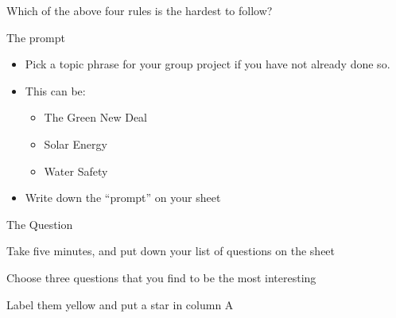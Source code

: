 \begin{frame}{Which of the above four rules is the hardest to follow?}
\protect\hypertarget{which-of-the-above-four-rules-is-the-hardest-to-follow}{}

\end{frame}

\begin{frame}{The prompt}
\protect\hypertarget{the-prompt}{}

\begin{itemize}
\tightlist
\item
  Pick a topic phrase for your group project if you have not already
  done so.
\item
  This can be:

  \begin{itemize}
  \tightlist
  \item
    The Green New Deal
  \item
    Solar Energy
  \item
    Water Safety
  \end{itemize}
\item
  Write down the ``prompt'' on your sheet
\end{itemize}

\end{frame}

\begin{frame}{The Question}
\protect\hypertarget{the-question}{}

Take five minutes, and put down your list of questions on the sheet

\end{frame}

\begin{frame}{Choose three questions that you find to be the most
interesting}
\protect\hypertarget{choose-three-questions-that-you-find-to-be-the-most-interesting}{}

Label them yellow and put a star in column A

\end{frame}

